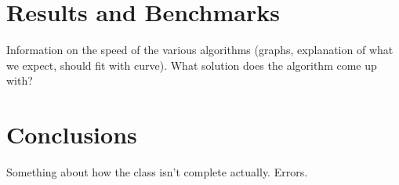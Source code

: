 \documentclass[12pt]{article}
\numberwithin{equation}{section}
\begin{document}
\section{Results and Benchmarks}
\label{sec:results}

Information on the speed of the various algorithms (graphs, explanation of what we expect, should fit with curve).  What solution does the algorithm come up with?  

\section{Conclusions}
\label{sec:conclusions}

Something about how the class isn't complete actually.  Errors.
\end{document}
